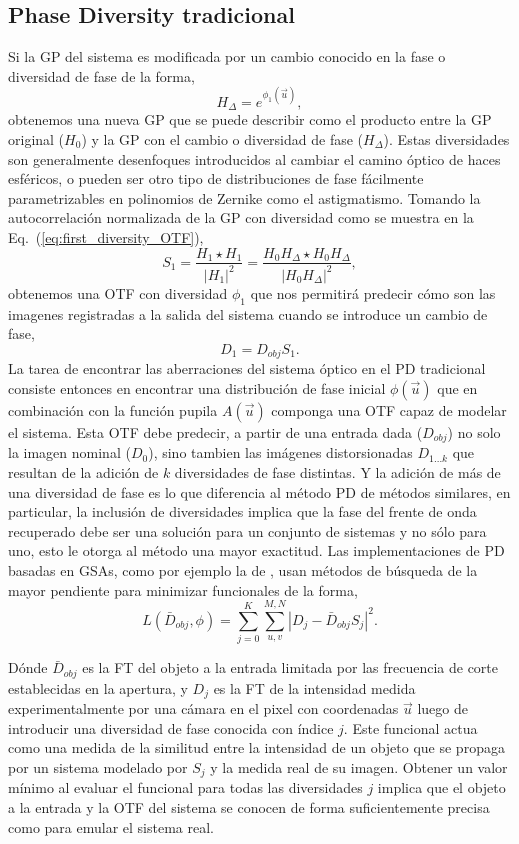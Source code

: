 \subsection{Phase Diversity tradicional}
\label{sec:ChPD_PD_tradicional}
Si la GP del sistema es modificada por un cambio conocido en la fase o
diversidad de fase de la forma,
$$H_{\Delta}=e^{\phi_1(\vec{u})},$$ 
obtenemos una nueva GP que se puede describir como el producto entre
la GP original ($H_{0}$) y la GP con el cambio o diversidad de fase
($H_{\Delta}$). Estas diversidades son generalmente desenfoques
introducidos al cambiar el camino óptico de haces esféricos, o pueden
ser otro tipo de distribuciones de fase fácilmente parametrizables en
polinomios de Zernike como el astigmatismo. Tomando la autocorrelación normalizada de la GP con
diversidad como se muestra en la Eq.~(\ref{eq:first_diversity_OTF}),
\begin{equation}\label{eq:first_diversity_OTF}
S_1 = \frac{H_1\star H_1}{|H_1|^2} = \frac{H_0H_{\Delta} \star H_0H_{\Delta}}{|H_0H_{\Delta}|^2},
\end{equation}
obtenemos una OTF con diversidad $\phi_1$ que nos permitirá predecir cómo son
las imagenes registradas a la salida del sistema cuando se introduce
un cambio de fase, $$D_1 = D_{obj} S_1.$$ 
La tarea de encontrar las aberraciones del sistema óptico en el PD
tradicional consiste entonces en encontrar una distribución de fase
inicial $\phi(\vec{u})$ que en combinación con la función pupila
$A(\vec{u})$ componga una OTF capaz de modelar el
sistema. Esta OTF debe predecir, a partir de una entrada dada 
($D_{obj}$)  no solo la imagen nominal ($D_0$), sino tambien
las imágenes distorsionadas $D_{1...k}$ que resultan de la adición de
$k$ diversidades de fase distintas. Y la adición de más de una
diversidad de fase es lo que diferencia al método PD de métodos
similares, en particular, la inclusión de diversidades implica que la
fase del frente de onda recuperado debe ser una solución para un
conjunto de sistemas y no sólo para uno, esto le otorga al método una
mayor exactitud. Las implementaciones de PD basadas en GSAs, como por
ejemplo la de , usan
métodos de búsqueda de la mayor pendiente para 
minimizar funcionales de la forma,
\begin{equation}\label{eq:metric}
L(\bar{D}_{obj}, \phi)= \sum_{j=0}^{K} \sum_{u,v}^{M,N}  \left |D_{j} - \bar{D}_{obj} S_{j} \right | ^2.
\end{equation}

Dónde $\bar{D}_{obj}$ es la FT del objeto a la entrada limitada por las frecuencia
de corte establecidas en la apertura, y $D_{j}$ es la FT de la intensidad
medida experimentalmente por una cámara en el pixel con coordenadas $\vec{u}$ luego de
introducir una diversidad de fase conocida con índice $j$.      
Este funcional actua como una medida de la similitud entre la
intensidad de un objeto que se propaga por un sistema modelado por
$S_{j}$ y la medida real de su imagen. Obtener un valor mínimo al
evaluar el funcional para todas las diversidades $j$ implica que el objeto a la entrada y la OTF del
sistema se conocen de forma suficientemente precisa como para emular
el sistema real.   

